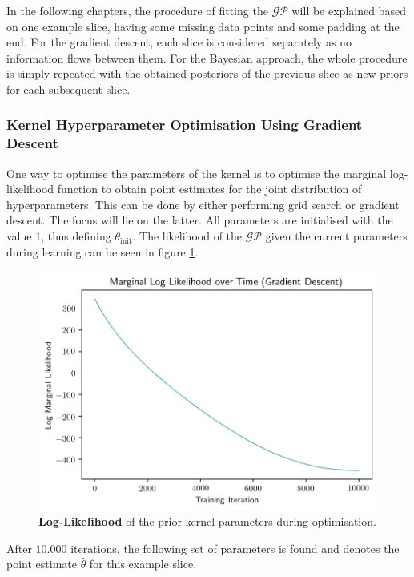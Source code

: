 \documentclass[11pt]{scrartcl}
\begin{document}
In the following chapters, the procedure of fitting the $\mathcal{GP}$ will be explained based on one example slice, having some missing data points and some padding at the end. For the gradient descent, each slice is considered separately as no information flows between them. For the Bayesian approach, the whole procedure is simply repeated with the obtained posteriors of the previous slice as new priors for each subsequent slice.

\FloatBarrier
\subsubsection{Kernel Hyperparameter Optimisation Using Gradient Descent}

One way to optimise the parameters of the kernel is to optimise the marginal log-likelihood function to obtain point estimates for the joint distribution of hyperparameters. This can be done by either performing grid search or gradient descent. The focus will lie on the latter. All parameters are initialised with the value $1$, thus defining $\theta_{\text{init}}$. The likelihood of the $\mathcal{GP}$ given the current parameters during learning can be seen in figure \ref{fig:gp_likelihood}.

\begin{figure}[hbt]
	\center
	\includegraphics[width=1.0\textwidth]{img/gp/gp_likelihood.png}
	\caption{\textcolor{viridis5}{\textbf{Log-Likelihood}} of the prior kernel parameters during optimisation.}
	\label{fig:gp_likelihood}
\end{figure}

After $10.000$ iterations, the following set of parameters is found and denotes the point estimate $\hat{\theta}$ for this example slice. 
\end{document}
